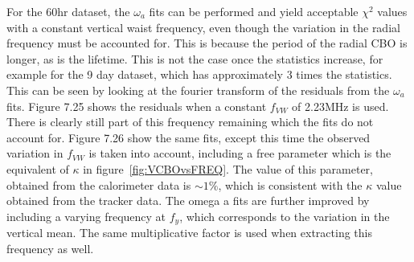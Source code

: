 For the 60hr dataset, the $\omega_{a}$ fits can be performed and yield acceptable $\chi^2$ values with a constant vertical waist frequency, even though the variation in the radial frequency must be accounted for. This is because the period of the radial CBO is longer, as is the lifetime. This is not the case once the statistics increase, for example for the 9 day dataset, which has approximately 3 times the statistics. This can be seen by looking at the fourier transform of the residuals from the $\omega_{a}$ fits. Figure 7.25 shows the residuals when a constant $f_{VW}$ of 2.23MHz  is used. There is clearly still part of this frequency remaining which the fits do not account for. Figure 7.26 show the same fits, except this time the observed variation in $f_{VW}$ is taken into account, including a free parameter which is the equivalent of $\kappa$ in figure~\ref{fig:VCBOvsFREQ}. The value of this parameter, obtained from the calorimeter data is $\sim{1}\%$, which is consistent with the $\kappa$ value obtained from the tracker data. The omega a fits are further improved by including a varying frequency at $f_{y}$, which corresponds to the variation in the vertical mean. The same multiplicative factor is used when extracting this frequency as well.     






